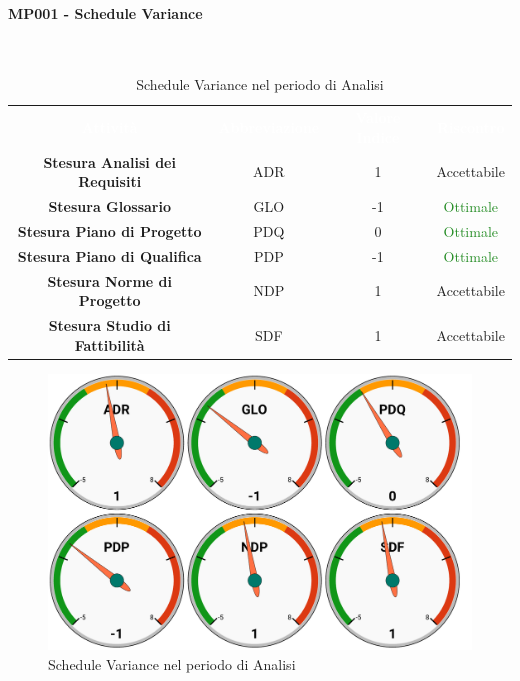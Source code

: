 \paragraph{MP001 - Schedule Variance}\mbox{}\\[0,3cm]
\begin{table}[H]
    \centering
    \begin{tabular}{cccc}
        \rowcolor{greySWEight}
        \textcolor{white}{\textbf{Attività}} & 
        \textcolor{white}{\textbf{Abbreviazione}} &
        \textcolor{white}{\textbf{Valore Indice}}&
        \textcolor{white}{\textbf{Riscontro}}\\
		\textbf{Stesura Analisi dei Requisiti} & ADR & 1 & \textcolor{YellowOrange}{Accettabile}\\
		\textbf{Stesura Glossario} & GLO & -1 & \textcolor{ForestGreen}{Ottimale} \\
		\textbf{Stesura Piano di Progetto} & PDQ & 0 & \textcolor{ForestGreen}{Ottimale} \\
		\textbf{Stesura Piano di Qualifica} & PDP & -1 & \textcolor{ForestGreen}{Ottimale} \\
		\textbf{Stesura Norme di Progetto} & NDP & 1 & \textcolor{YellowOrange}{Accettabile} \\
		\textbf{Stesura Studio di Fattibilità} & SDF & 1 & \textcolor{YellowOrange}{Accettabile} \\

    \end{tabular}
    \caption{Schedule Variance nel periodo di Analisi}
\end{table}
\begin{figure}[H]
    \centering
	\includegraphics[width=1\linewidth]{sez/App_Esito/Analisi/graph/AN_SV.pdf}
	\caption{Schedule Variance nel periodo di Analisi}
\end{figure}

